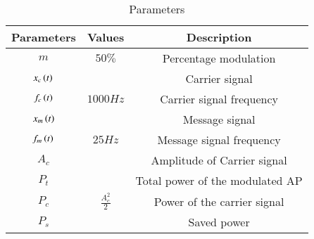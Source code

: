\begin{table}[htbp]
    \centering
    \begin{tabular}{|c|c|c|} \hline
      \textbf{Parameters} & \textbf{Values} & \textbf{Description} \\ \hline
      $m$ & $50\%$ & Percentage modulation \\ \hline
      $x_c\left(t\right)$ & & Carrier signal \\ \hline
      $f_c\left(t\right)$ & $1000 Hz$ & Carrier signal frequency \\ \hline
      $x_m\left(t\right)$ & & Message signal \\ \hline
      $f_m\left(t\right)$ & $25 Hz$ & Message signal frequency \\ \hline
      $A_c$ & & Amplitude of Carrier signal \\ \hline
      $P_t$ & & Total power of the modulated AP \\ \hline
      $P_c$ & $\frac{A_c^2}{2}$ & Power of the carrier signal \\ \hline
      $P_s$ & & Saved power \\ \hline
    \end{tabular}
    \vspace{3pt}
    \caption{Parameters}
\end{table}
